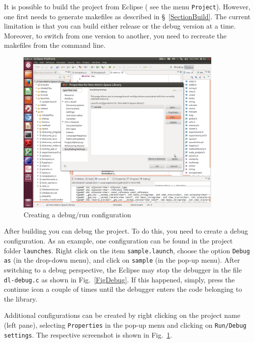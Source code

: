 \documentclass[runningheads,a4paper]{llncs}
\newcommand{\ttt}[1]{\texttt{#1}}
\begin{document}
{It is possible to build the project from Eclipse (
see the menu \texttt{Project}).
However, one first needs to generate makefiles as described in \S~\ref{SectionBuild}.
The current limitation is that you can build either release
or the debug version at a time.
Moreover, to switch from one version to another, you need to recreate
the makefiles from the command line.

\begin{figure}
\caption{\label{FigDebugConf}Creating a debug/run configuration}
\includegraphics[width=0.9\textwidth]{figures/EclipseDebugConf.pdf}
\end{figure}

After building you can debug the project.
To do this, you need to create a debug configuration.
As an example, one configuration can be found in the 
project folder \ttt{launches}.
Right click on the item \ttt{sample.launch},
choose the option \ttt{Debug as} (in the drop-down menu),
and click on \ttt{sample} (in the pop-up menu).
After switching to a debug perspective,
the Eclipse may stop the debugger in 
the file \ttt{dl-debug.c} as shown in Fig.~\ref{FigDebug}.
If this happened, simply, press the continue icon a couple of
times until the debugger enters the code belonging to the library.

Additional configurations can be created by right clicking
on the project name (left pane), selecting \ttt{Properties}
in the pop-up menu and clicking on \ttt{Run/Debug settings}. 
The respective screenshot is shown in Fig.~\ref{FigDebugConf}.


}
\end{document}
